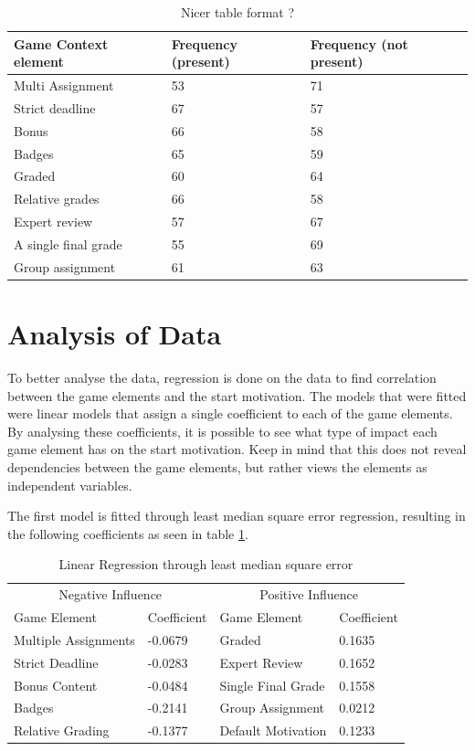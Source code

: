\documentclass[11pt]{article}
\newcommand{\ra}[1]{\renewcommand{\arraystretch}{#1}}
\begin{document}
\begin{table}\centering
\ra{1.3}
\begin{tabular}{@{}lll@{}}
\toprule
Game Context element & Frequency (present) & Frequency (not present) \\ 
\midrule
Multi Assignment & 53 & 71 \\
Strict deadline & 67 & 57 \\
Bonus & 66 & 58 \\
Badges & 65 & 59 \\
Graded & 60 & 64 \\
Relative grades & 66 & 58 \\
Expert review & 57 & 67 \\
A single final grade & 55 & 69 \\
Group assignment & 61 & 63 \\
\bottomrule
\end{tabular}
\caption{Nicer table format ?}
\end{table}

\clearpage
\section{Analysis of Data}
To better analyse the data, regression is done on the data to find correlation between the game elements and the start motivation. The models that were fitted were linear models that assign a single coefficient to each of the game elements. By analysing these coefficients, it is possible to see what type of impact each game element has on the start motivation. Keep in mind that this does not reveal dependencies between the game elements, but rather views the elements as independent variables. 

The first model is fitted through least median square error regression, resulting in the following coefficients as seen in table \ref{lmsreg}.

\begin{table}[h!t]\centering
\ra{1.3}
\begin{tabular}{@{}llll@{}}
\toprule
\multicolumn{2}{c}{Negative Influence} & \multicolumn{2}{c}{Positive Influence} \\
Game Element & Coefficient &  Game Element& Coefficient  \\ 
\cmidrule(r){1-2}
\cmidrule(r){3-4}
Multiple Assignments 	& -0.0679 	& Graded 		& 0.1635 \\
Strict Deadline 	& -0.0283 	& Expert Review 	& 0.1652 \\
Bonus Content 		& -0.0484 	& Single Final Grade 	& 0.1558 \\
Badges 			& -0.2141 	& Group Assignment 	& 0.0212 \\
Relative Grading 	& -0.1377 	& Default Motivation	& 0.1233\\
\bottomrule
\end{tabular}
\caption{Linear Regression through least median square error}
\label{lmsreg}
\end{table}
\end{document}
